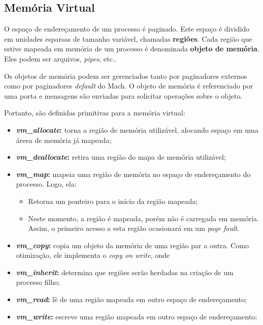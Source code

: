 \subsection{Memória Virtual}
O espaço de endereçamento de um processo é paginado. Este espaço é dividido em unidades esparsas de tamanho variável, chamadas \textbf{regiões}. Cada região que estive mapeada em memória de um processo é denominada \textbf{objeto de memória}. Eles podem ser arquivos, \textit{pipes}, etc..

Os objetos de memória podem ser gerenciados tanto por paginadores externos como por paginadores \textit{default} do Mach. O objeto de memória é referenciado por uma porta e mensagens são enviadas para solicitar operações sobre o objeto.

Portanto, são definidas primitivas para a memória virtual:
\begin{itemize}
  \item \textbf{\textit{vm\_allocate}:} torna a região de memória utilizável, alocando espaço em uma áreea de memória já mapeada;

  \item \textbf{\textit{vm\_deallocate}:} retira uma região do mapa de memória utilizável;

  \item \textbf{\textit{vm\_map}:} mapeia uma região de memória no espaço de endereçamento do processo. Logo, ela:
  \begin{itemize}
    \item Retorna um ponteiro para o início da região mapeada;

    \item Neste momento, a região é mapeada, porém não é carregada em memória. Assim, o primeiro acesso a esta região ocasionará em um \textit{page fault}.
  \end{itemize}

  \item \textbf{\textit{vm\_copy}:} copia um objeto da memória de uma região par a outra. Como otimização, ele implementa o \textit{copy on write}, onde %

  \item \textbf{\textit{vm\_inherit}:} determina que regiões serão herdadas na criação de um processo filho;

  \item \textbf{\textit{vm\_read}:} lê de uma região mapeada em outro espaço de endereçamento;

  \item \textbf{\textit{vm\_write}:} escreve uma região mapeada em outro espaço de endereçamento;

\end{itemize}

